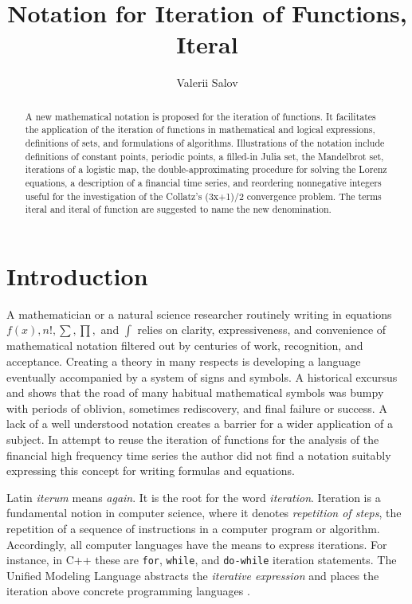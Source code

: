 \documentclass{article}
\begin{document}
\title{Notation for Iteration of Functions, Iteral}
\author{Valerii Salov}
\date{}
\maketitle

\begin{abstract}
A new mathematical notation is proposed for the iteration of functions. It facilitates the application of the iteration of functions in mathematical and logical expressions, definitions of sets, and formulations of algorithms. Illustrations of the notation include definitions of constant points, periodic points, a filled-in Julia set, the Mandelbrot set, iterations of a logistic map, the double-approximating procedure for solving the Lorenz equations, a description of a financial time series, and reordering nonnegative integers useful for the investigation of the Collatz's (3x+1)/2 convergence problem. The terms iteral and iteral of function are suggested to name the new denomination.
\end{abstract}

\section{Introduction}

A mathematician or a natural science researcher routinely writing in equations $f(x), n!, \sum, \prod,$ and $\int$ relies on clarity, expressiveness, and convenience of mathematical notation filtered out by centuries of work, recognition, and acceptance. Creating a theory in many respects is developing a language eventually accompanied by a system of signs and symbols. A historical excursus \cite[pp. 441 - 443]{boyer} and \cite{cajori} shows that the road of many habitual mathematical symbols was bumpy with periods of oblivion, sometimes rediscovery, and final failure or success. A lack of a well understood notation creates a barrier for a wider application of a subject. In attempt to reuse the iteration of functions for the analysis of the financial high frequency time series the author did not find a notation suitably expressing this concept for writing formulas and equations.

Latin \textit{iterum} means \textit{again}. It is the root for the word \textit{iteration}. Iteration is a fundamental notion in computer science, where it denotes \textit{repetition of steps}, the repetition of a sequence of instructions in a computer program or algorithm. Accordingly, all computer languages have the means to express iterations. For instance, in C++ \cite[pp. 136 - 137]{stroustrup} these are \texttt{for}, \texttt{while}, and \texttt{do-while} iteration statements. The Unified Modeling Language abstracts the \textit{iterative expression} and places the iteration above concrete programming languages \cite[pp. 318 - 319]{rumbaugh}.
\end{document}
